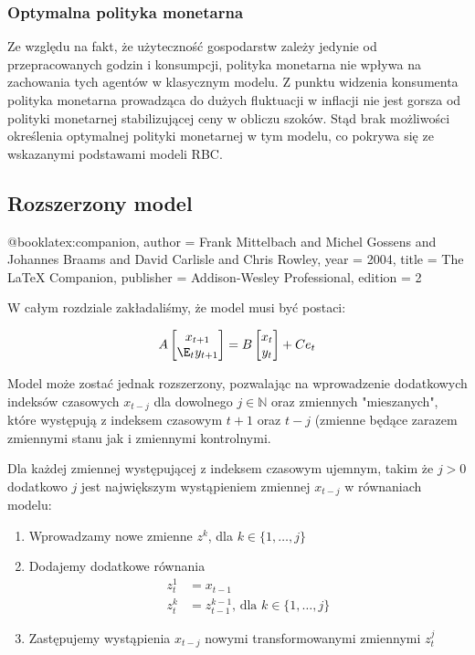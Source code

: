 \subsubsection{Optymalna polityka monetarna}

Ze względu na fakt, że użyteczność gospodarstw zależy jedynie od przepracowanych godzin i konsumpcji, polityka monetarna nie wpływa na zachowania tych agentów w klasycznym modelu. Z punktu widzenia konsumenta polityka monetarna prowadząca do dużych fluktuacji w inflacji nie jest gorsza od polityki monetarnej stabilizującej ceny w obliczu szoków. Stąd brak możliwości określenia optymalnej polityki monetarnej w tym modelu, co pokrywa się ze wskazanymi podstawami modeli RBC.


\subsection{Rozszerzony model}

@book{latex:companion,
  author = {Frank Mittelbach and Michel Gossens
            and Johannes Braams and David Carlisle
            and Chris Rowley},
  year = {2004},
  title = {The \LaTeX{} Companion},
  publisher = {Addison-Wesley Professional},
  edition = {2}
}


W całym rozdziale zakładaliśmy, że model musi być postaci:

\begin{equation*}
    A \begin{bmatrix}
    x_{t+1} \\
    \E_t y_{t+1}
\end{bmatrix} = B \begin{bmatrix}
    x_{t} \\
    y_{t}
\end{bmatrix} + C e_t
\end{equation*}

Model może zostać jednak rozszerzony, pozwalając na wprowadzenie dodatkowych indeksów czasowych $x_{t - j}$ dla dowolnego $j \in \mathbb{N}$ oraz zmiennych "mieszanych", które występują z indeksem czasowym $t+1$ oraz $t-j$ (zmienne będące zarazem zmiennymi stanu jak i zmiennymi kontrolnymi.

Dla każdej zmiennej występującej z indeksem czasowym ujemnym, takim że $j > 0$ dodatkowo $j$ jest największym wystąpieniem zmiennej $x_{t-j}$ w równaniach modelu:
\begin{enumerate}
    \item Wprowadzamy nowe zmienne $z^k$, dla $k \in \{1,\dots, j\}$
    \item Dodajemy dodatkowe równania
    \begin{align*}
        z^1_t &= x_{t-1} \\
        z^k_t &= z^{k-1}_{t-1} \text{, dla } k \in \{1,\dots, j\}
    \end{align*}
    \item Zastępujemy wystąpienia $x_{t - j}$ nowymi transformowanymi zmiennymi $z^j_t$
\end{enumerate}

